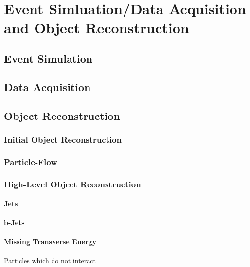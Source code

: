 \chapter{Event Simluation/Data Acquisition and Object Reconstruction}\label{chapter:data-mc}

\section{Event Simulation}

\section{Data Acquisition}

\section{Object Reconstruction}
\subsection{Initial Object Reconstruction}
\subsection{Particle-Flow}
\cite{CMS-PRF-14-001}
\subsection{High-Level Object Reconstruction}
\subsubsection{Jets}
\subsubsection{b-Jets}
\subsubsection{Missing Transverse Energy}
Particles which do not interact 